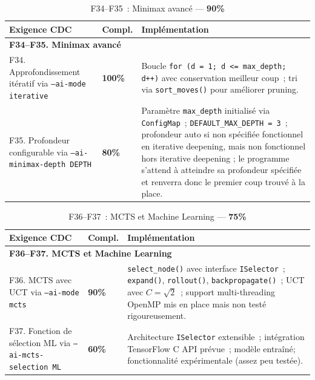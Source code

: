 \documentclass[a4paper]{article}
\begin{document}
\begin{table}[H]
\centering
\renewcommand{\arraystretch}{1.4}
\begin{tabular}{|p{6cm}|p{1.5cm}|p{8cm}|}
\hline
\textbf{Exigence CDC} & \textbf{Compl.} & \textbf{Implémentation} \\
\hline
\multicolumn{3}{|l|}{\textbf{F34--F35. Minimax avancé}} \\
\hline
F34. Approfondissement itératif via \texttt{--ai-mode iterative}
& \textbf{100\%}
& Boucle \texttt{for (d = 1; d <= max\_depth; d++)} avec conservation meilleur coup~; tri via \texttt{sort\_moves()} pour améliorer pruning. \\
\hline
F35. Profondeur configurable via \texttt{--ai-minimax-depth DEPTH}
& \textbf{80\%}
& Paramètre \texttt{max\_depth} initialisé via \texttt{ConfigMap}~; \texttt{DEFAULT\_MAX\_DEPTH = 3}~; profondeur auto si non spécifiée fonctionnel en iterative deepening, mais non fonctionnel hors iterative deepening ; le programme s'attend à atteindre sa profondeur spécifiée et renverra donc le premier coup trouvé à la place. \\
\hline
\end{tabular}
\caption{F34--F35~: Minimax avancé --- \textbf{90\%}}
\label{tab:f34-f35}
\end{table}
 
 
\begin{table}[H]
\centering
\renewcommand{\arraystretch}{1.4}
\begin{tabular}{|p{6cm}|p{1.5cm}|p{8cm}|}
\hline
\textbf{Exigence CDC} & \textbf{Compl.} & \textbf{Implémentation} \\
\hline
\multicolumn{3}{|l|}{\textbf{F36--F37. MCTS et Machine Learning}} \\
\hline
F36. MCTS avec UCT via \texttt{--ai-mode mcts}
& \textbf{90\%}
& \texttt{select\_node()} avec interface \texttt{ISelector}~; \texttt{expand()}, \texttt{rollout()}, \texttt{backpropagate()}~; UCT avec $C = \sqrt{2}$~; support multi-threading OpenMP mis en place mais non testé rigoureusement. \\
\hline
F37. Fonction de sélection ML via \texttt{--ai-mcts-selection ML}
& \textbf{60\%}
& Architecture \texttt{ISelector} extensible~; intégration TensorFlow C API prévue~; modèle entraîné; fonctionnalité expérimentale (assez peu testée). \\
\hline
\end{tabular}
\caption{F36--F37~: MCTS et Machine Learning --- \textbf{75\%}}
\label{tab:f36-f37}
\end{table}
 
\end{document}
